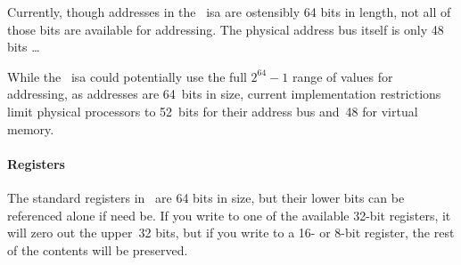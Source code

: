 Currently, though addresses in the \arch\ \ac{isa} are ostensibly 64 bits in length,
not all of those bits are available for addressing.
The physical address bus itself is only 48 bits
\todo\dots

While the \arch\ \ac{isa} could potentially use the full $2^{64}-1$
range of values for addressing, as addresses are 64~bits in size,
current implementation restrictions limit physical processors to
52~bits for their address bus and~48 for virtual memory.

\paragraph{Registers}\label{par:reg}
The standard registers in \arch\ are 64 bits in size,
but their lower bits can be referenced alone if need be.
If you write to one of the available 32-bit registers,
it will zero out the upper~32 bits, but if you write to a 16- or 8-bit register,
the rest of the contents will be preserved.
